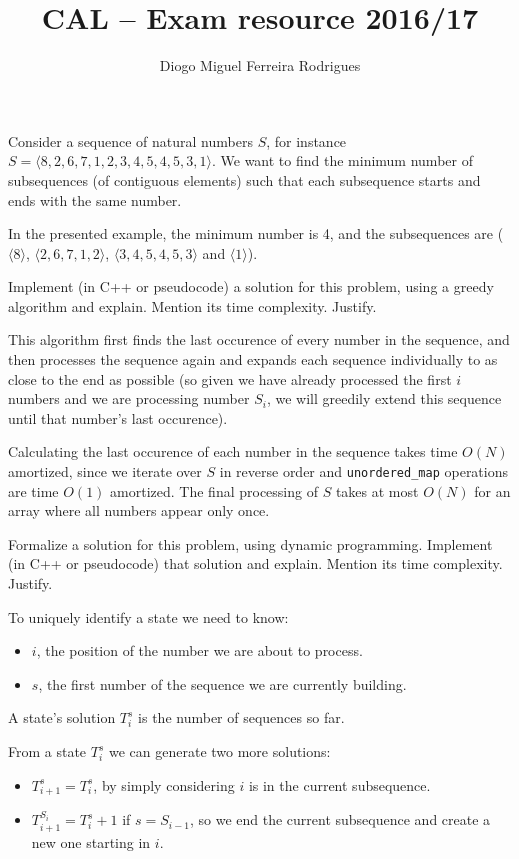 \documentclass{cal}
\title{CAL -- Exam resource 2016/17}
\author{Diogo Miguel Ferreira Rodrigues \\ \email{dmfrodrigues2000@gmail.com}}
\begin{document}
{
\renewcommand{\thechapter}{\arabic{chapter}R}
\setcounter{chapter}{16}

Consider a sequence of natural numbers $S$, for instance $S = \langle 8, 2, 6, 7, 1, 2, 3, 4, 5, 4, 5, 3, 1 \rangle$. We want to find the minimum number of subsequences (of contiguous elements) such that each subsequence starts and ends with the same number.

In the presented example, the minimum number is 4, and the subsequences are ($\langle 8 \rangle$, $\langle 2, 6, 7, 1, 2 \rangle$, $\langle 3, 4, 5, 4, 5, 3 \rangle$ and $\langle 1 \rangle$).

Implement (in C++ or pseudocode) a solution for this problem, using a greedy algorithm and explain. Mention its time complexity. Justify.

\ansseparator



This algorithm first finds the last occurence of every number in the sequence, and then processes the sequence again and expands each sequence individually to as close to the end as possible (so given we have already processed the first $i$ numbers and we are processing number $S_i$, we will greedily extend this sequence until that number's last occurence).

Calculating the last occurence of each number in the sequence takes time $O(N)$ amortized, since we iterate over $S$ in reverse order and \texttt{unordered\_map} operations are time $O(1)$ amortized. The final processing of $S$ takes at most $O(N)$ for an array where all numbers appear only once.

Formalize a solution for this problem, using dynamic programming. Implement (in C++ or pseudocode) that solution and explain. Mention its time complexity. Justify.

\ansseparator

To uniquely identify a state we need to know:
\begin{itemize}
    \item $i$, the position of the number we are about to process.
    \item $s$, the first number of the sequence we are currently building.
\end{itemize}

A state's solution $T_i^s$ is the number of sequences so far.

From a state $T_i^s$ we can generate two more solutions:
\begin{itemize}
    \item $T_{i+1}^s = T_i^s$, by simply considering $i$ is in the current subsequence.
    \item $T_{i+1}^{S_i} = T_i^s + 1$ if $s = S_{i-1}$, so we end the current subsequence and create a new one starting in $i$.
\end{itemize}

}
\end{document}
